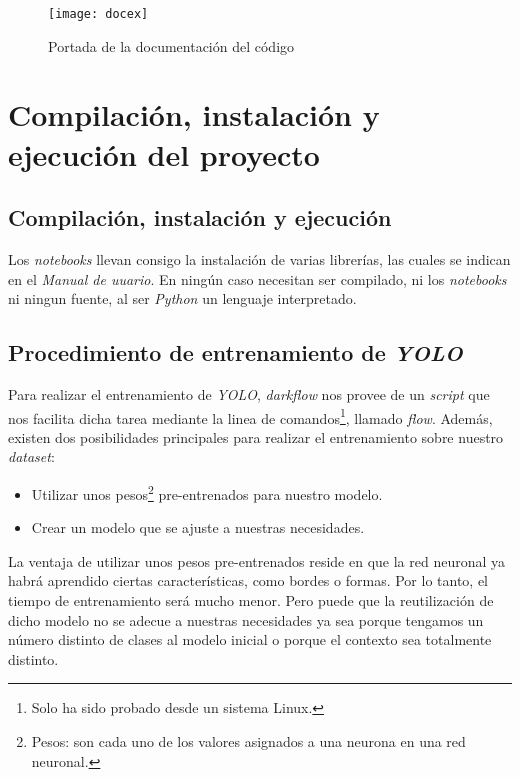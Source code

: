 \begin{figure}
\centering
\texttt{[image: docex]}
\caption{Portada de la documentación del código}
\label{fig:D.3}
\end{figure}

\section{Compilación, instalación y ejecución del proyecto}

\subsection{Compilación, instalación y ejecución}

Los \textit{notebooks} llevan consigo la instalación de varias librerías, las cuales se indican en el \textit{Manual de uuario}. En ningún caso necesitan ser compilado, ni los \textit{notebooks} ni ningun fuente, al ser \textit{Python} un lenguaje interpretado.  

\subsection{Procedimiento de entrenamiento de \textit{YOLO}}

Para realizar el entrenamiento de \textit{YOLO}, \textit{darkflow} nos provee de un \textit{script} que nos facilita dicha tarea mediante la linea de comandos\footnote{Solo ha sido probado desde un sistema Linux.}, llamado \textit{flow}. Además, existen dos posibilidades principales para realizar el entrenamiento sobre nuestro \textit{dataset}:

\begin{itemize}
	\item Utilizar unos pesos\footnote{Pesos: son cada uno de los valores asignados a una neurona en una red neuronal.} pre-entrenados para nuestro modelo.
	\item Crear un modelo que se ajuste a nuestras necesidades.
\end{itemize}

La ventaja de utilizar unos pesos pre-entrenados reside en que la red neuronal ya habrá aprendido ciertas características, como bordes o formas. Por lo tanto, el tiempo de entrenamiento será mucho menor. Pero puede que la reutilización de dicho modelo no se adecue a nuestras necesidades ya sea porque tengamos un número distinto de clases al modelo inicial o porque el contexto sea totalmente distinto.

